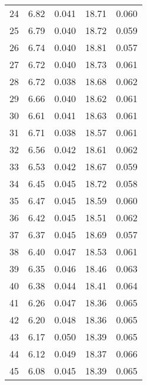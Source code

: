 \begin{table}
\begin{tabular}{c|ll|ll}
24 & 6.82 & 0.041 & 18.71 & 0.060 \\
25 & 6.79 & 0.040 & 18.72 & 0.059 \\
26 & 6.74 & 0.040 & 18.81 & 0.057 \\
27 & 6.72 & 0.040 & 18.73 & 0.061 \\
28 & 6.72 & 0.038 & 18.68 & 0.062 \\
29 & 6.66 & 0.040 & 18.62 & 0.061 \\
30 & 6.61 & 0.041 & 18.63 & 0.061 \\
31 & 6.71 & 0.038 & 18.57 & 0.061 \\
32 & 6.56 & 0.042 & 18.61 & 0.062 \\
33 & 6.53 & 0.042 & 18.67 & 0.059 \\
34 & 6.45 & 0.045 & 18.72 & 0.058 \\
35 & 6.47 & 0.045 & 18.59 & 0.060 \\
36 & 6.42 & 0.045 & 18.51 & 0.062 \\
37 & 6.37 & 0.045 & 18.69 & 0.057 \\
38 & 6.40 & 0.047 & 18.53 & 0.061 \\
39 & 6.35 & 0.046 & 18.46 & 0.063 \\
40 & 6.38 & 0.044 & 18.41 & 0.064 \\
41 & 6.26 & 0.047 & 18.36 & 0.065 \\
42 & 6.20 & 0.048 & 18.36 & 0.065 \\
43 & 6.17 & 0.050 & 18.39 & 0.065 \\
44 & 6.12 & 0.049 & 18.37 & 0.066 \\
45 & 6.08 & 0.045 & 18.39 & 0.065 \\
               \hline
        \end{tabular}
    \end{table}
    \clearpage

